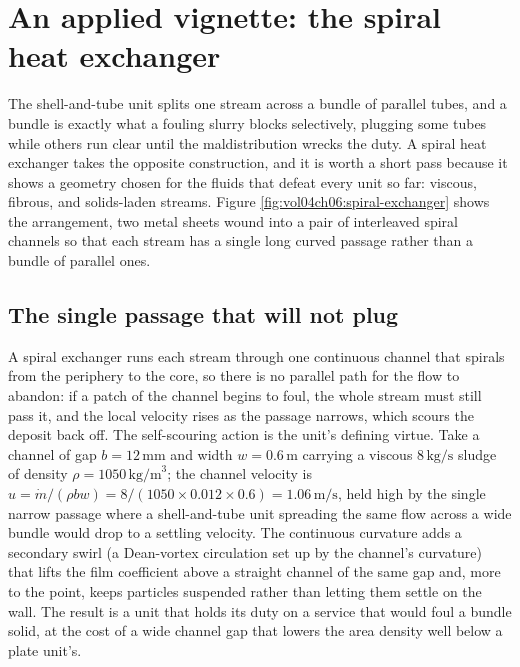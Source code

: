 \section{An applied vignette: the spiral heat exchanger}

The shell-and-tube unit splits one stream across a bundle of parallel tubes, and a
bundle is exactly what a fouling slurry blocks selectively, plugging some tubes while
others run clear until the maldistribution wrecks the duty. A spiral heat exchanger
takes the opposite construction, and it is worth a short pass because it shows a
geometry chosen for the fluids that defeat every unit so far: viscous, fibrous, and
solids-laden streams. Figure \ref{fig:vol04ch06:spiral-exchanger} shows the
arrangement, two metal sheets wound into a pair of interleaved spiral channels so
that each stream has a single long curved passage rather than a bundle of parallel
ones.



\subsection{The single passage that will not plug}

A spiral exchanger runs each stream through one continuous channel that spirals from
the periphery to the core, so there is no parallel path for the flow to abandon: if a
patch of the channel begins to foul, the whole stream must still pass it, and the
local velocity rises as the passage narrows, which scours the deposit back off. The
self-scouring action is the unit's defining virtue. Take a channel of gap
$b = 12\,\si{\milli\meter}$ and width $w = 0.6\,\text{m}$ carrying a viscous
$8\,\text{kg/s}$ sludge of density $\rho = 1050\,\text{kg/m}^3$; the channel velocity
is $u = \dot{m}/(\rho b w) = 8/(1050\times 0.012\times 0.6) = 1.06\,\text{m/s}$, held
high by the single narrow passage where a shell-and-tube unit spreading the same flow
across a wide bundle would drop to a settling velocity. The continuous curvature adds
a secondary swirl (a Dean-vortex circulation set up by the channel's curvature) that
lifts the film coefficient above a straight channel of the same gap and, more to the
point, keeps particles suspended rather than letting them settle on the wall. The
result is a unit that holds its duty on a service that would foul a bundle solid, at
the cost of a wide channel gap that lowers the area density well below a plate unit's.

